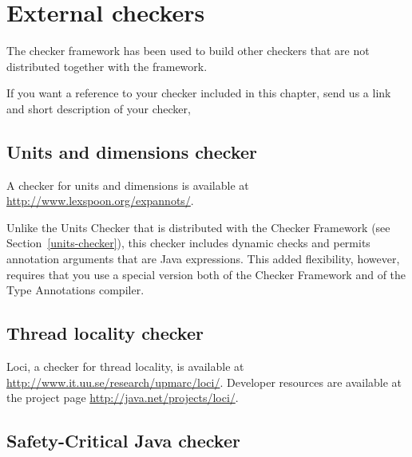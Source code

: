 \htmlhr
\chapter{External checkers\label{external-checkers}}

The checker framework has been used to build other checkers that are not
distributed together with the framework.

If you want a reference to your checker included in this chapter,
send us a link and short description of your checker, 


\section{Units and dimensions checker\label{units-and-dimensions-checker}}

A checker for units and dimensions is available at
\url{http://www.lexspoon.org/expannots/}.

Unlike the Units Checker that is distributed with the Checker Framework
(see Section~\ref{units-checker}), this checker includes dynamic checks and
permits annotation arguments that are Java expressions.  This added
flexibility, however, requires that you use a special version both of the
Checker Framework and of the Type Annotations compiler.


\section{Thread locality checker\label{loci-thread-locality-checker}}

Loci, a checker for thread locality, is available at
\url{http://www.it.uu.se/research/upmarc/loci/}.
Developer resources are available at the project page
\url{http://java.net/projects/loci/}.







\section{Safety-Critical Java checker\label{safety-critical-java-checker}}

